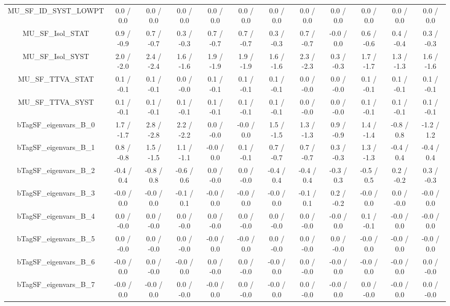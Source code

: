 \begin{table}[htbp]
\begin{center}
\begin{tabular}{|c|c|c|c|c|c|c|c|c|c|c|c|}
  MU_SF_ID_SYST_LOWPT & 0.0 / 0.0 & 0.0 / 0.0 & 0.0 / 0.0 & 0.0 / 0.0 & 0.0 / 0.0 & 0.0 / 0.0 & 0.0 / 0.0 & 0.0 / 0.0 & 0.0 / 0.0 & 0.0 / 0.0 & 0.0 / 0.0 \\ 
  MU_SF_Isol_STAT & 0.9 / -0.9 & 0.7 / -0.7 & 0.3 / -0.3 & 0.7 / -0.7 & 0.7 / -0.7 & 0.3 / -0.3 & 0.7 / -0.7 & -0.0 / 0.0 & 0.6 / -0.6 & 0.4 / -0.4 & 0.3 / -0.3 \\ 
  MU_SF_Isol_SYST & 2.0 / -2.0 & 2.4 / -2.4 & 1.6 / -1.6 & 1.9 / -1.9 & 1.9 / -1.9 & 1.6 / -1.6 & 2.3 / -2.3 & 0.3 / -0.3 & 1.7 / -1.7 & 1.3 / -1.3 & 1.6 / -1.6 \\ 
  MU_SF_TTVA_STAT & 0.1 / -0.1 & 0.1 / -0.1 & 0.0 / -0.0 & 0.1 / -0.1 & 0.1 / -0.1 & 0.1 / -0.1 & 0.0 / -0.0 & 0.0 / -0.0 & 0.1 / -0.1 & 0.1 / -0.1 & 0.1 / -0.1 \\ 
  MU_SF_TTVA_SYST & 0.1 / -0.1 & 0.1 / -0.1 & 0.1 / -0.1 & 0.1 / -0.1 & 0.1 / -0.1 & 0.1 / -0.1 & 0.0 / -0.0 & 0.0 / -0.0 & 0.1 / -0.1 & 0.1 / -0.1 & 0.1 / -0.1 \\ 
  bTagSF_eigenvars_B_0 & 1.7 / -1.7 & 2.8 / -2.8 & 2.2 / -2.2 & 0.0 / -0.0 & -0.0 / 0.0 & 1.5 / -1.5 & 1.3 / -1.3 & 0.9 / -0.9 & 1.4 / -1.4 & -0.8 / 0.8 & -1.2 / 1.2 \\ 
  bTagSF_eigenvars_B_1 & 0.8 / -0.8 & 1.5 / -1.5 & 1.1 / -1.1 & -0.0 / 0.0 & 0.1 / -0.1 & 0.7 / -0.7 & 0.7 / -0.7 & 0.3 / -0.3 & 1.3 / -1.3 & -0.4 / 0.4 & -0.4 / 0.4 \\ 
  bTagSF_eigenvars_B_2 & -0.4 / 0.4 & -0.8 / 0.8 & -0.6 / 0.6 & 0.0 / -0.0 & 0.0 / -0.0 & -0.4 / 0.4 & -0.4 / 0.4 & -0.3 / 0.3 & -0.5 / 0.5 & 0.2 / -0.2 & 0.3 / -0.3 \\ 
  bTagSF_eigenvars_B_3 & -0.0 / 0.0 & -0.0 / 0.0 & -0.1 / 0.1 & -0.0 / 0.0 & -0.0 / 0.0 & -0.0 / 0.0 & -0.1 / 0.1 & 0.2 / -0.2 & -0.0 / 0.0 & 0.0 / -0.0 & -0.0 / 0.0 \\ 
  bTagSF_eigenvars_B_4 & 0.0 / -0.0 & 0.0 / -0.0 & 0.0 / -0.0 & 0.0 / -0.0 & 0.0 / -0.0 & 0.0 / -0.0 & 0.0 / -0.0 & -0.0 / 0.0 & 0.1 / -0.1 & -0.0 / 0.0 & -0.0 / 0.0 \\ 
  bTagSF_eigenvars_B_5 & 0.0 / -0.0 & 0.0 / -0.0 & 0.0 / -0.0 & -0.0 / 0.0 & -0.0 / 0.0 & 0.0 / -0.0 & 0.0 / -0.0 & 0.0 / -0.0 & -0.0 / 0.0 & -0.0 / 0.0 & -0.0 / 0.0 \\ 
  bTagSF_eigenvars_B_6 & -0.0 / 0.0 & 0.0 / -0.0 & -0.0 / 0.0 & 0.0 / -0.0 & 0.0 / -0.0 & -0.0 / 0.0 & 0.0 / -0.0 & -0.0 / 0.0 & -0.0 / 0.0 & -0.0 / 0.0 & 0.0 / -0.0 \\ 
  bTagSF_eigenvars_B_7 & -0.0 / 0.0 & -0.0 / 0.0 & 0.0 / -0.0 & -0.0 / 0.0 & 0.0 / -0.0 & -0.0 / 0.0 & 0.0 / -0.0 & -0.0 / 0.0 & 0.0 / -0.0 & -0.0 / 0.0 & 0.0 / -0.0 \\ 

\end{tabular}
\end{center}
\end{table}
